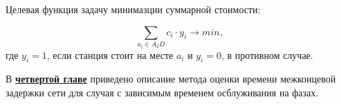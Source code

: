 





Целевая функция задачу минимазции суммарной стоимости:

$$
    \sum_{a_i \in A_2D} c_i \cdot y_i \to min,
$$
где $y_i = 1$, если станция стоит на месте $a_i$ и $y_i = 0$, в противном случае.




В \underline{\textbf{четвертой главе}} приведено описание метода оценки времени межконцевой задержки сети для случая с зависимым временем осблуживания на фазах.

